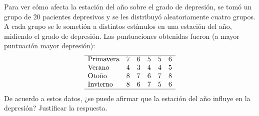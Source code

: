 {Para ver cómo afecta la estación del año sobre el grado de depresión, se tomó un grupo de 20 pacientes depresivos y se les distribuyó aleatoriamente cuatro grupos.
A cada grupo se le sometión a distintos estímulos en una estación del año, midiendo el grado de depresión.
Las puntuaciones obtenidas fueron (a mayor puntuación mayor depresión):
\[
\begin{array}{lccccc}
\hline
\mbox{Primavera} & 7 & 6 & 5 & 5 & 6\\
\mbox{Verano}    & 4 & 3 & 4 & 4 & 5\\
\mbox{Otoño}     & 8 & 7 & 6 & 7 & 8\\
\mbox{Invierno}  & 8 & 6 & 7 & 5 & 6\\
\hline
\end{array}
\]
De acuerdo a estos datos, ¿se puede afirmar que la estación del año influye en la depresión?
Justificar la respuesta.
}
